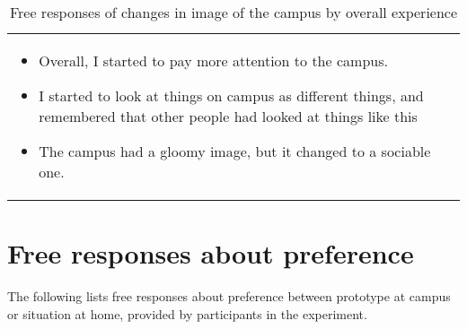 \begin{table}[h]
    \begin{center}
      \caption{Free responses of changes in image of the campus by overall experience}\label{table:14}
      \begin{tabular}{L{\textwidth}}
        \hline
           \\
        \hline
          {
            \begin{itemize}
              \item Overall, I started to pay more attention to the campus.
              \item I started to look at things on campus as different things, and remembered that other people had looked at things like this
              \item The campus had a gloomy image, but it changed to a sociable one.
            \end{itemize}
          } \\
        \hline
    \end{tabular}
\end{center} 
\end{table}


\chapter{Free responses about preference}

The following lists free responses about preference between prototype at campus or situation at home, provided by participants in the experiment.


